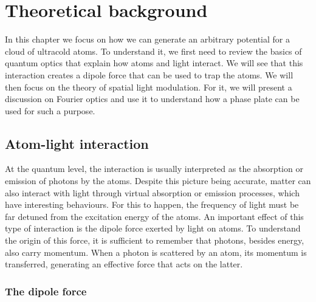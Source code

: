 \chapter{Theoretical background}
In this chapter we focus on how we can generate an arbitrary potential for a cloud of ultracold atoms. To understand it, we first need to review the basics of quantum optics that explain how atoms and light interact. We will see that this interaction creates a dipole force that can be used to trap the atoms. We will then focus on the theory of spatial light modulation. For it, we will present a discussion on Fourier optics and use it to understand how a phase plate can be used for such a purpose.

\section{Atom-light interaction}
At the quantum level, the interaction is usually interpreted as the absorption or emission of photons by the atoms. Despite this picture being accurate, matter can also interact with light through virtual absorption or emission processes, which have interesting behaviours. For this to happen, the frequency of light must be far detuned from the excitation energy of the atoms. An important effect of this type of interaction is the dipole force exerted by light on atoms. To understand the origin of this force, it is sufficient to remember that photons, besides energy, also carry momentum. When a photon is scattered by an atom, its momentum is transferred, generating an effective force that acts on the latter.

\subsection{The dipole force}

